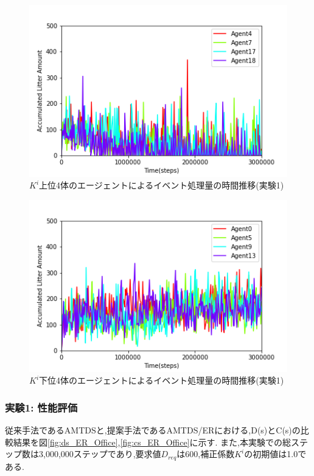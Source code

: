 \documentclass[12pt,a4j,twoside]{jarticle}
\begin{document}
  \begin{figure}
    \centering
    \includegraphics[width=150mm]{figures/al_graph_ER_Office_top.png}
    \caption{$K^i$上位4体のエージェントによるイベント処理量の時間推移(実験1)}
    \label{fig:al_ER_Office_top}
  \end{figure}

  \begin{figure}
    \centering
    \includegraphics[width=150mm]{figures/al_graph_ER_Office_worst.png}
    \caption{$K^i$下位4体のエージェントによるイベント処理量の時間推移(実験1)}
    \label{fig:al_ER_Office_worst}
  \end{figure}

  \subsubsection{実験1: 性能評価}
  \label{ex:ER1}
  従来手法であるAMTDSと,提案手法であるAMTDS/ERにおける,D(s)とC(s)の比較結果を図\ref{fig:ds_ER_Office},\ref{fig:cs_ER_Office}に示す.
  また,本実験での総ステップ数は3,000,000ステップであり,要求値$D_{req}$は600,補正係数$K^i$の初期値は1.0である.
\end{document}
